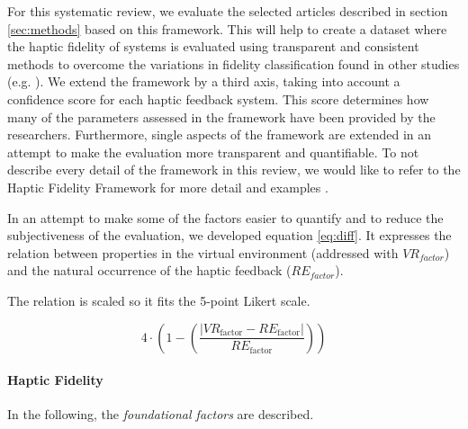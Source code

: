 For this systematic review, we evaluate the selected articles described in section \ref{sec:methods}  based on this framework. This will help to create a dataset where the haptic fidelity of systems is evaluated using transparent and consistent methods to overcome the variations in fidelity classification found in other studies (e.g. \cite{Yang2023, Grant2019}). We extend the framework by a third axis, taking into account a confidence score for each haptic feedback system. This score determines how many of the parameters assessed in the framework have been provided by the researchers. Furthermore, single aspects of the framework are extended in an attempt to make the evaluation more transparent and quantifiable. 
To not describe every detail of the framework in this review, we would like to refer to the Haptic Fidelity Framework for more detail and examples \cite{Muender2022HapticReality}.

In an attempt to make some of the factors easier to quantify and to reduce the subjectiveness of the evaluation, we developed equation \ref{eq:diff}. It expresses the relation between properties in the virtual environment (addressed with $VR_{factor}$) and the natural occurrence of the haptic feedback ($RE_{factor}$). 

The relation is scaled so it fits the 5-point Likert scale.

\begin{equation}    
4 \cdot \left(1 - \left(\frac{\left|VR_{\text{factor}} - RE_{\text{factor}}\right|}{RE_{\text{factor}}}\right)\right)
\label{eq:diff}
\end{equation}



\paragraph{Haptic Fidelity}
\label{sec:foundationallimiting}

In the following, the \textit{foundational factors} are described.

